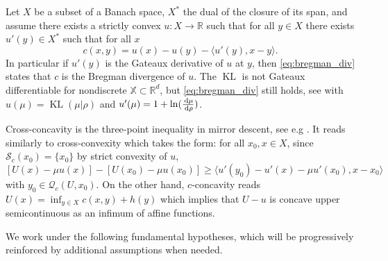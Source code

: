 \documentclass[reqno]{amsart}
\theoremstyle{plain}
\theoremstyle{remark}
\theoremstyle{plain}
\numberwithin{equation}{section}
\theoremstyle{remark}
\newenvironment{continuance}[1]
  {\newcommand\continuanceref{\ref{#1}}\continuancex}
  {\endcontinuancex}
\newcommand{\R}{\mathbb{R}}
\newcommand{\X}{\mathbb{X}}
\newcommand{\de}{{\,\rm d}}
\newcommand{\bracket}[1]{\langle #1 \rangle}
\DeclareMathOperator{\KL}{KL}
\begin{document}
\begin{continuance}{ex:KL} Let $X$ be a subset of a Banach space, $X^*$ the dual of the closure of its span, and assume there exists a strictly convex $u:X\to\R$ such that for all $y\in X$ there exists $u'(y)\in X^*$ such that for all $x$
\begin{equation}\label{eq:bregman_div}
    c(x,y)=u(x)-u(y)-\bracket{u'(y),x-y}.
\end{equation}
In particular if $u'(y)$ is the Gateaux derivative of $u$ at $y$, then \eqref{eq:bregman_div} states that $c$ is the Bregman divergence of $u$. The $\KL$ is not Gateaux differentiable for nondiscrete $\X\subset \R^d$, but \eqref{eq:bregman_div} still holds, see \cite[Example 2]{aubin2022mirror_measures} with $u(\mu)=\KL(\mu|\rho)$ and $u'(\mu)=1+\ln(\frac{ \de  \mu}{ \de  \rho})$. 

Cross-concavity is the three-point inequality in mirror descent, see e.g \cite[Lemma 3.2]{chen1993convergence}. It reads similarly to cross-convexity which takes the form: for all $x_0,x\in X$, since $\mathcal{S}_c(x_0)=\{x_0\}$ by strict convexity of $u$,
\begin{equation}\label{eq:bregman_div2}
    [U(x)-\mu u(x)]-[U(x_0)-\mu u(x_0)] \ge \bracket{u'(y_0)-u'(x)-\mu u'(x_0),x-x_0}
\end{equation}
with $y_0\in \mathcal{Q}_c(U,x_0)$. On the other hand, $c$-concavity reads $U(x)=\inf_{y\in  X }c(x,y)+h(y)$ which implies that $U-u$ is concave upper semicontinuous as an infimum of affine functions.

\end{continuance}






We work under the following fundamental hypotheses, which will be progressively reinforced by additional assumptions when needed.
\end{document}
